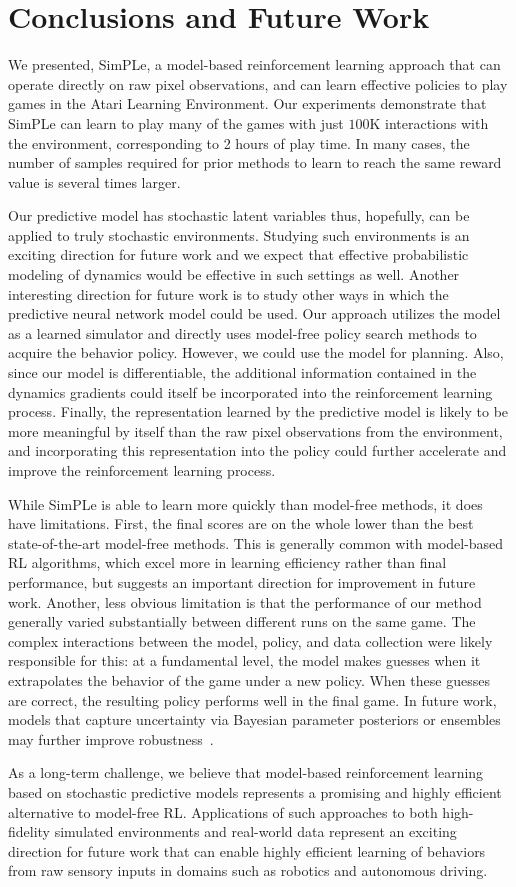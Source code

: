 \section{Conclusions and Future Work}

We presented, SimPLe, a model-based reinforcement learning approach that can operate directly on raw pixel observations, and can learn effective policies to play games in the Atari Learning Environment. Our experiments demonstrate that SimPLe can learn to play many of the games with just $100$K interactions with the environment, corresponding to 2 hours of play time. In many cases, the number of samples required for prior methods to learn to reach the same reward value is several times larger.

Our predictive model has stochastic latent variables thus, hopefully, can be applied to truly stochastic environments. Studying such environments is an exciting direction for future work and we expect that effective probabilistic modeling of dynamics would be effective in such settings as well. Another interesting direction for future work is to study other ways in which the predictive neural network model could be used. Our approach utilizes the model as a learned simulator and directly uses model-free policy search methods to acquire the behavior policy. However, we could use the model for planning. Also, since our model is differentiable, the additional information contained in the dynamics gradients could itself be incorporated into the reinforcement learning process. Finally, the representation learned by the predictive model is likely to be more meaningful by itself than the raw pixel observations from the environment, and incorporating this representation into the policy could further accelerate and improve the reinforcement learning process.

While SimPLe is able to learn more quickly than model-free methods, it does have limitations. First, the final scores are on the whole lower than the best state-of-the-art model-free methods. This is generally common with model-based RL algorithms, which excel more in learning efficiency rather than final performance, but suggests an important direction for improvement in future work. Another, less obvious limitation is that the performance of our method generally varied substantially between different runs on the same game. The complex interactions between the model, policy, and data collection were likely responsible for this: at a fundamental level, the model makes guesses when it extrapolates the behavior of the game under a new policy. When these guesses are correct, the resulting policy performs well in the final game. In future work, models that capture uncertainty via Bayesian parameter posteriors or ensembles may further improve robustness~\cite{trpo_ensemble, Chua18}.

As a long-term challenge, we believe that model-based reinforcement learning based on stochastic predictive models represents a promising and highly efficient alternative to model-free RL. Applications of such approaches to both high-fidelity simulated environments and real-world data represent an exciting direction for future work that can enable highly efficient learning of behaviors from raw sensory inputs in domains such as robotics and autonomous driving.
